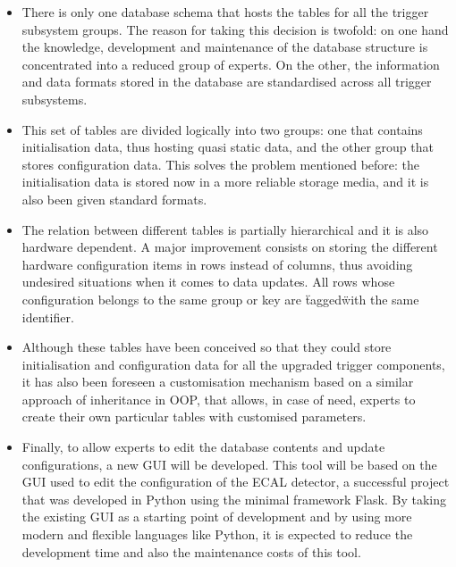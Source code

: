 \documentclass[a4paper]{jpconf}
\begin{document}
\begin{itemize}
  \item There is only one database schema that hosts the tables for all the trigger subsystem groups. The reason for taking this decision is twofold: on one hand the knowledge, development and maintenance of the database structure is concentrated into a reduced group of experts. On the other, the information and data formats stored in the database are standardised across all trigger subsystems.
  \item This set of tables are divided logically into two groups: one that contains initialisation data, thus hosting quasi static data, and the other group that stores configuration data. This solves the problem mentioned before: the initialisation data is stored now in a more reliable storage media, and it is also been given standard formats. 
  \item The relation between different tables is partially hierarchical and it is also hardware dependent. A major improvement consists on storing the different hardware configuration items in rows instead of columns, thus avoiding undesired situations when it comes to data updates. All rows whose configuration belongs to the same group or key are \"tagged\" with the same identifier. 
  
  
  \item Although these tables have been conceived so that they could store initialisation and configuration data for all the upgraded trigger components, it has also been foreseen a customisation mechanism based on a similar approach of inheritance in OOP, that allows, in case of need, experts to create their own particular tables with customised parameters. 

  \item Finally, to allow experts to edit the database contents and update configurations, a new GUI will be developed. This tool will be based on the GUI used to edit the configuration of the ECAL detector, a successful project that was developed in Python using the minimal framework Flask. By taking the existing GUI as a starting point of development and by using more modern and flexible languages like Python, it is expected  to reduce the development time and also the maintenance costs of this tool.

\end{itemize}
\end{document}
